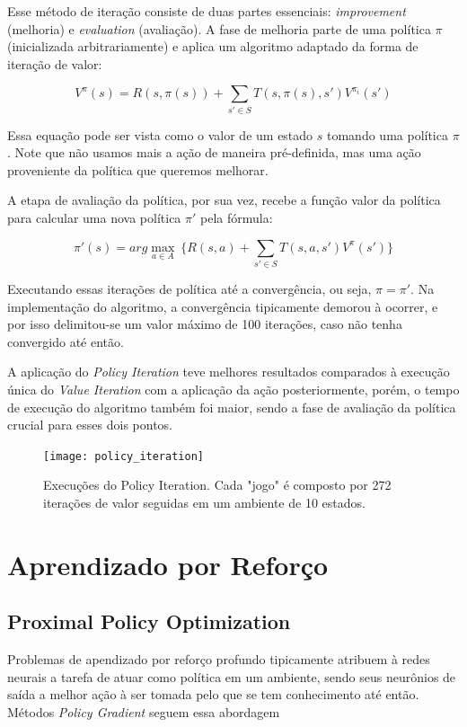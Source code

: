 \documentclass[letterpaper]{article} %
\begin{document}
Esse método de iteração consiste de duas partes essenciais: \textit{improvement} (melhoria) e \textit{evaluation} (avaliação). A fase de melhoria parte de uma política $\pi$ (inicializada arbitrariamente) e aplica um algoritmo adaptado da forma de iteração de valor:

$$
V^{\pi}(s) = R(s,\pi(s)) + \sum_{s' \in S} T(s,\pi(s),s')  V^{\pi_i}(s')
$$

Essa equação pode ser vista como o valor de um estado $s$ tomando uma política $\pi$. Note que não usamos mais a ação de maneira pré-definida, mas uma ação proveniente da política que queremos melhorar.

A etapa de avaliação da política, por sua vez, recebe a função valor da política para calcular uma nova política $\pi'$ pela fórmula:

$$
\pi'(s) = arg \max_{a \in A} \ \{ R(s,a) + \sum_{s' \in S} T(s,a,s')  V^{\pi}(s')\}
$$

Executando essas iterações de política até a convergência, ou seja, $\pi = \pi'$. Na implementação do algoritmo, a convergência tipicamente demorou à ocorrer, e por isso delimitou-se um valor máximo de 100 iterações, caso não tenha convergido até então.

A aplicação do \textit{Policy Iteration} teve melhores resultados comparados à execução única do \textit{Value Iteration} com a aplicação da ação posteriormente, porém, o tempo de execução do algoritmo também foi maior, sendo a fase de avaliação da política crucial para esses dois pontos.

\begin{figure}[h]
	\center
	\texttt{[image: policy\_iteration]}
    \caption{Execuções do Policy Iteration. Cada "jogo" é composto por 272 iterações de valor seguidas em um ambiente de 10 estados.}
\end{figure}

\section{Aprendizado por Reforço}

\subsection{Proximal Policy Optimization}
Problemas de apendizado por reforço profundo tipicamente atribuem à redes neurais a tarefa de atuar como política em um ambiente, sendo seus neurônios de saída a melhor ação à ser tomada pelo que se tem conhecimento até então. Métodos \textit{Policy Gradient} seguem essa abordagem
\end{document}
